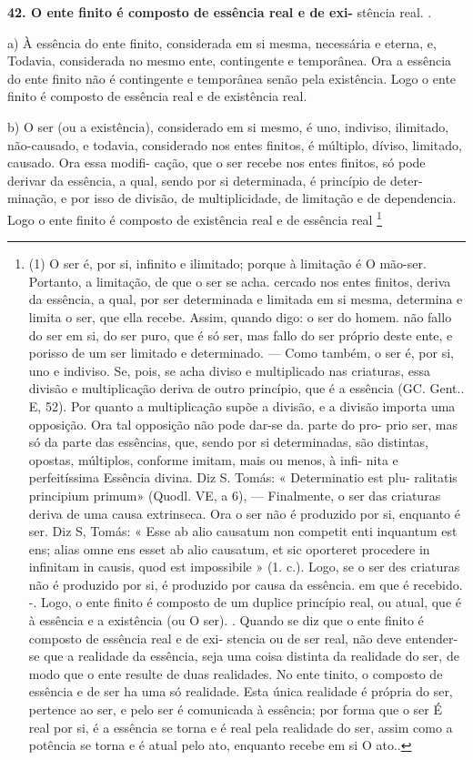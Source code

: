 \documentclass[12pt,a4paper]{article}
\begin{document}
{{{{{{{{{{{{\medskip\noindent\textbf{42. O ente finito é composto de essência real e de exi-}
 stência real. .

     \medskip\noindent a) À essência do ente finito, considerada em si mesma, 
 necessária e eterna, e, Todavia, considerada no mesmo ente,
 contingente e temporânea. Ora a essência do ente finito não é
 contingente e temporânea senão pela existência. Logo o ente finito
 é composto de essência real e de existência real.

     \medskip\noindent b) O ser (ou a existência), considerado em si mesmo, é uno,
 indiviso, ilimitado, não-causado, e todavia, considerado nos entes
 finitos, é múltiplo, díviso, limitado, causado. Ora essa modifi-
 cação, que o ser recebe nos entes finitos, só pode derivar da
 essência, a qual, sendo por si determinada, é princípio de deter-
 minação, e por isso de divisão, de multiplicidade, de limitação
 e de dependencia. Logo o ente finito é composto de existência
 real e de essência real \footnote{(1) O ser é, por si, infinito e ilimitado; porque à limitação é O mão-ser.
 Portanto, a limitação, de que o ser se acha. cercado nos entes finitos, deriva
 da essência, a qual, por ser determinada e limitada em si mesma, determina
 e limita o ser, que ella recebe. Assim, quando digo: o ser do homem. não fallo
 do ser em si, do ser puro, que é só ser, mas fallo do ser próprio deste ente,
 e porisso de um ser limitado e determinado. — Como também, o ser é,
 por si, uno e indiviso. Se, pois, se acha diviso e multiplicado nas criaturas,
 essa divisão e multiplicação deriva de outro princípio, que é a essência (GC.
 Gent.. E, 52). Por quanto a multiplicação supõe a divisão, e a divisão
 importa uma opposição. Ora tal opposição não pode dar-se da. parte do pro-
 prio ser, mas só da parte das essências, que, sendo por si determinadas, são
 distintas, opostas, múltiplos, conforme imitam, mais ou menos, à infi-
 nita e perfeitíssima Essência divina. Diz S. Tomás: « Determinatio est plu-
 ralitatis principium primum» (Quodl. VE, a 6), — Finalmente, o ser das
 criaturas deriva de uma causa extrinseca. Ora o ser não é produzido por si,
 enquanto é ser. Diz S, Tomás: « Esse ab alio causatum non competit enti
 inquantum est ens; alias omne ens esset ab alio causatum, et sic oporteret
 procedere in infinitam in causis, quod est impossibile » (1. c.). Logo, se o
 ser des criaturas não é produzido por si, é produzido por causa da essência.
 em que é recebido. -. Logo, o ente finito é composto de um duplice princípio
 real, ou atual, que é à essência e a existência (ou O ser). .
 Quando se diz que o ente finito é composto de essência real e de exi-
 stencia ou de ser real, não deve entender-se que a realidade da essência,
 seja uma coisa distinta da realidade do ser, de modo que o ente resulte de
 duas realidades. No ente tinito, o composto de essência e de ser ha uma só
 realidade. Esta única realidade é própria do ser, pertence ao ser, e pelo ser
 é comunicada à essência; por forma que o ser É real por si, é a essência
 se torna e é real pela realidade do ser, assim como a potência se torna e é
 atual pelo ato, enquanto recebe em si O ato.. 

}}}}}}}}}}}}}
\end{document}
